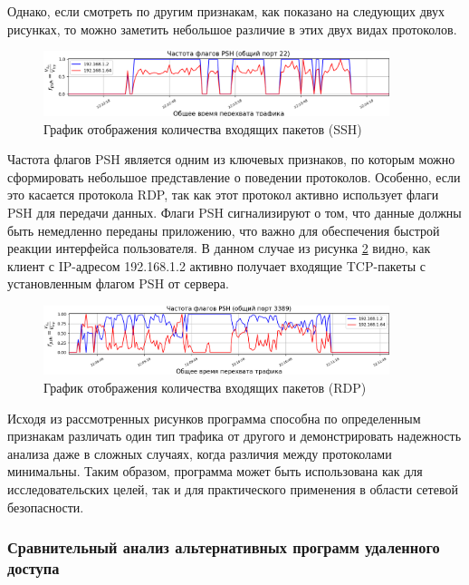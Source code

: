 \documentclass[spec, och, diploma]{SCWorks}
\begin{document}
Однако, если смотреть по другим признакам, как показано на следующих двух рисунках, то можно заметить небольшое различие в этих двух видах протоколов.

\begin{figure}[H]
  \centering
  \includegraphics[width=0.9\textwidth]{pics/newssh2.png}
  \caption{График отображения количества входящих пакетов (SSH)}
  \label{sshg2}
\end{figure}

Частота флагов PSH является одним из ключевых признаков, по которым можно сформировать небольшое представление о поведении протоколов. Особенно, если это касается
протокола RDP, так как этот протокол активно использует флаги PSH для передачи данных. Флаги PSH сигнализируют о том, что данные должны быть немедленно 
переданы приложению, что важно для обеспечения быстрой реакции интерфейса пользователя. В данном случае из рисунка \ref{rdpg2} видно, как клиент с IP-адресом 192.168.1.2
активно получает входящие TCP-пакеты с установленным флагом PSH от сервера.

\begin{figure}[H]
  \centering
  \includegraphics[width=0.9\textwidth]{pics/newrdp2.png}
  \caption{График отображения количества входящих пакетов (RDP)}
  \label{rdpg2}
\end{figure}



Исходя из рассмотренных рисунков программа способна по определенным признакам различать один тип трафика от другого и демонстрировать 
надежность анализа даже в сложных случаях, когда различия между протоколами минимальны. Таким образом, программа может быть использована 
как для исследовательских целей, так и для практического применения в области сетевой безопасности.

\subsubsection{Сравнительный анализ альтернативных программ удаленного доступа}
\end{document}
